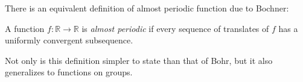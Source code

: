 \documentclass[12pt]{article}
\begin{document}
There is an equivalent definition of almost periodic function due to Bochner:

A function $f \colon \mathbb{R} \to \mathbb{R}$ is \emph{almost periodic} if 
every sequence of translates of $f$ has a uniformly convergent subsequence.

Not only is this definition simpler to state than that of Bohr, 
but it  also generalizes to functions on groups.

\end{document}

